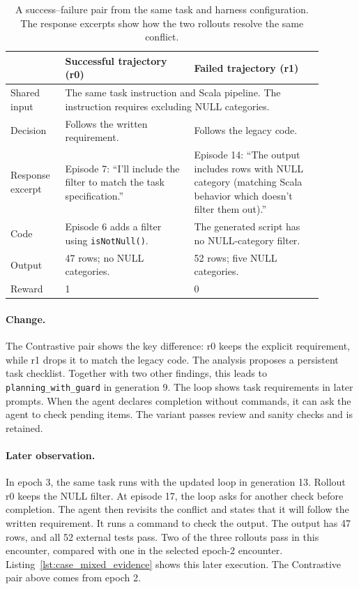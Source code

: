 \documentclass{article} %
\begin{document}
\begin{table}[t]
\centering
\small
\caption{A success--failure pair from the same task and harness configuration.
The response excerpts show how the two rollouts resolve the same conflict.}
\setlength{\tabcolsep}{4pt}
\renewcommand{\arraystretch}{1.15}
\begin{tabular}{p{0.15\linewidth}p{0.37\linewidth}p{0.37\linewidth}}
\toprule
& \textbf{Successful trajectory (r0)} & \textbf{Failed trajectory (r1)} \\
\midrule
Shared input & \multicolumn{2}{p{0.76\linewidth}}{The same task instruction and Scala pipeline. The instruction requires excluding NULL categories.} \\
Decision & Follows the written requirement. & Follows the legacy code. \\
Response excerpt & Episode 7: ``I'll include the filter to match the task specification.'' & Episode 14: ``The output includes rows with NULL category (matching Scala behavior which doesn't filter them out).'' \\
Code & Episode 6 adds a filter using \texttt{isNotNull()}. & The generated script has no NULL-category filter. \\
Output & 47 rows; no NULL categories. & 52 rows; five NULL categories. \\
Reward & 1 & 0 \\
\bottomrule
\end{tabular}
\label{tab:case_mixed_pair}
\end{table}

\paragraph{Change.}
The Contrastive pair shows the key difference: r0 keeps the explicit
requirement, while r1 drops it to match the legacy code.
The analysis proposes a persistent task checklist. Together with two other
findings, this leads to \texttt{planning\_with\_guard} in generation 9.
The loop shows task requirements in later prompts. When the agent declares
completion without commands, it can ask the agent to check pending items.
The variant passes review and sanity checks and is retained.

\paragraph{Later observation.}
In epoch 3, the same task runs with the updated loop in generation 13.
Rollout r0 keeps the NULL filter. At episode 17, the loop asks for another
check before completion. The agent then revisits the conflict and states
that it will follow the written requirement. It runs a command to check
the output. The output has 47 rows, and all 52 external tests pass.
Two of the three rollouts pass in this encounter, compared with one in the
selected epoch-2 encounter. Listing~\ref{lst:case_mixed_evidence} shows this
later execution. The Contrastive pair above comes from epoch 2.
\end{document}
